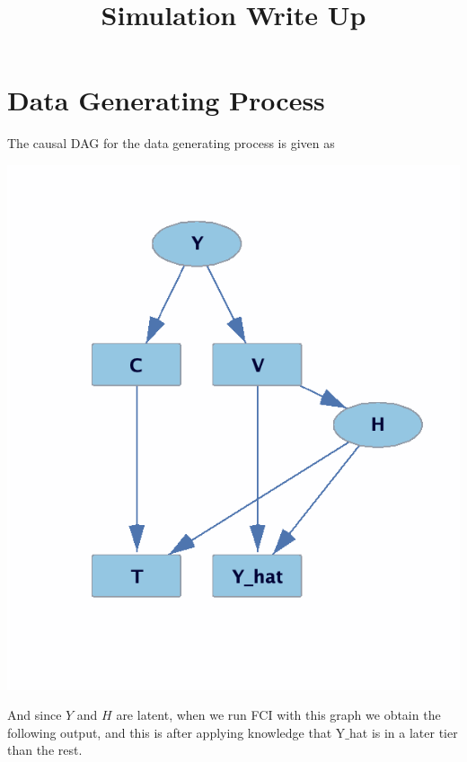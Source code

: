 \documentclass{article}
\title{Simulation Write Up}
\begin{document}
\maketitle

\section{Data Generating Process}

The causal DAG for the data generating process is given as 
\begin{center}
\includegraphics[scale = 0.5]{true_dgp.png}
\end{center}

And since $Y$ and $H$ are latent, when we run FCI with this graph we obtain the following output, and this is after applying knowledge that Y$\_$hat is in a later tier than the rest.
\end{document}
